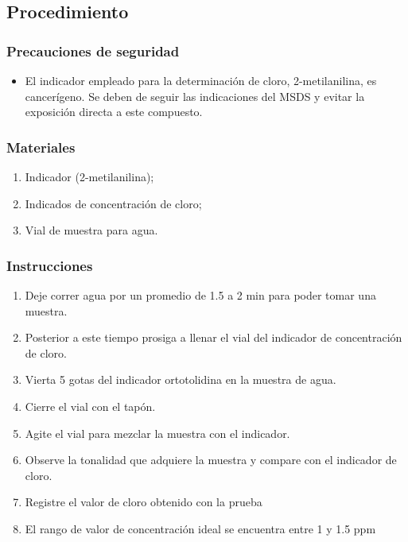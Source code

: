 \subsection{Procedimiento}

\subsubsection{Precauciones de seguridad}

\begin{itemize}
	\item El indicador empleado para la determinación de cloro, 2-metilanilina, es cancerígeno. Se deben de seguir las indicaciones del MSDS y evitar la exposición directa a este compuesto.
\end{itemize}

\subsubsection{Materiales}

\begin{enumerate}
	\item Indicador (2-metilanilina);
	\item Indicados de concentración de cloro;
	\item Vial de muestra para agua.
\end{enumerate}

\subsubsection{Instrucciones}

\begin{enumerate}
	\item Deje correr agua por un promedio de 1.5 a 2 min para poder tomar una muestra.
	\item Posterior a este tiempo prosiga a llenar el vial del indicador de concentración de cloro.
	\item Vierta 5 gotas del indicador ortotolidina en la muestra de agua.
	\item Cierre el vial con el tapón.
	\item Agite el vial para mezclar la muestra con el indicador.
	\item Observe la tonalidad que adquiere la muestra y compare con el indicador de cloro.
	\item Registre el valor de cloro obtenido con la prueba
	\item El rango de valor de concentración ideal se encuentra entre 1 y 1.5 ppm
\end{enumerate}

